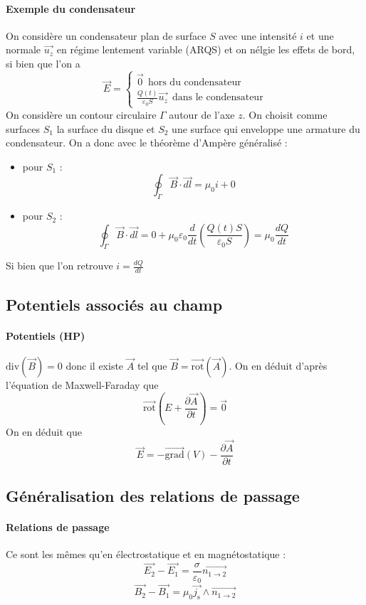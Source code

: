 \documentclass[french]{book}
\theoremstyle{plain}
\theoremstyle{definition}
\theoremstyle{remark}
\newcommand{\grad}{\overrightarrow{\text{grad}}}
\newcommand{\rot}{\overrightarrow{\text{rot}}}
\renewcommand{\div}{\text{div}}
\begin{document}
\paragraph{Exemple du condensateur} On considère un condensateur plan de surface $S$ avec une intensité $i$ et une normale $\overrightarrow{u_z}$ en régime lentement variable (ARQS) et on nélgie les effets de bord, si bien que l'on a $$\overrightarrow{E}=\begin{cases}
	\overrightarrow{0} \ \ \text{hors du condensateur}\\[1mm]
	\displaystyle\frac{Q(t)}{\varepsilon_0 S}\overrightarrow{u_z} \ \ \text{dans le condensateur}
\end{cases}$$
On considère un contour circulaire $\Gamma$ autour de l'axe $z$. On choisit comme surfaces $S_1$ la surface du disque et $S_2$ une surface qui enveloppe une armature du condensateur. On a donc avec le théorème d'Ampère généralisé : 
\begin{itemize}
	\item pour $S_1$ : $$\oint_\Gamma\overrightarrow{B}\cdot\overrightarrow{dl}=\mu_0 i +0$$
	\item pour $S_2$ : $$\oint_\Gamma\overrightarrow{B}\cdot\overrightarrow{dl}=0+\mu_0\varepsilon_0\frac{d}{dt}\left(\frac{Q(t)S}{\varepsilon_0 S}\right)=\mu_0\frac{dQ}{dt}$$
\end{itemize} Si bien que l'on retrouve $i=\displaystyle\frac{dQ}{dt}$
\subsection{Potentiels associés au champ}
\paragraph{Potentiels (HP)} $\div\left(\overrightarrow{B}\right)=0$ donc il existe $\overrightarrow{A}$ tel que $\overrightarrow{B}=\rot\left(\overrightarrow{A}\right)$. On en déduit d'après l'équation de Maxwell-Faraday que $$\rot\left(E+\frac{\partial\overrightarrow{A}}{\partial t}\right)=\overrightarrow{0}$$ On en déduit que $$\overrightarrow{E}=-\grad(V)-\frac{\partial \overrightarrow{A}}{\partial t}$$
\subsection{Généralisation des relations de passage}
\paragraph{Relations de passage} Ce sont les mêmes qu'en électrostatique et en magnétostatique : $$\overrightarrow{E_2}-\overrightarrow{E_1}=\frac{\sigma}{\varepsilon_0}\overrightarrow{n_{1\to 2}}$$
$$\overrightarrow{B_2}-\overrightarrow{B_1}=\mu_0\overrightarrow{j_\text{s}}\wedge\overrightarrow{n_{1\to 2}}$$
\end{document}
